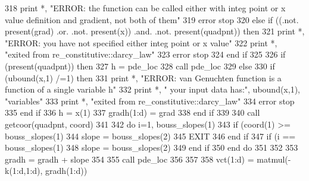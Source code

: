 \begin{DoxyCode}
318           print *, \textcolor{stringliteral}{"ERROR: the function can be called either with integ point or x value definition and
       gradient, not both of them"}
319           error stop
320         \textcolor{keywordflow}{else} \textcolor{keywordflow}{if} ((.not. \textcolor{keyword}{present}(grad) .or. .not. \textcolor{keyword}{present}(x)) .and. .not. \textcolor{keyword}{present}(quadpnt)) \textcolor{keywordflow}{then}
321           print *, \textcolor{stringliteral}{"ERROR: you have not specified either integ point or x value"}
322           print *, \textcolor{stringliteral}{"exited from re\_constitutive::darcy\_law"}
323           error stop
324 \textcolor{keywordflow}{        end if}
325         
326         \textcolor{keywordflow}{if} (\textcolor{keyword}{present}(quadpnt)) \textcolor{keywordflow}{then}
327           h = pde\_loc%
328           \textcolor{keyword}{call }pde\_loc%
329         \textcolor{keywordflow}{else}
330           \textcolor{keywordflow}{if} (ubound(x,1) /=1) \textcolor{keywordflow}{then}
331             print *, \textcolor{stringliteral}{"ERROR: van Genuchten function is a function of a single variable h"}
332             print *, \textcolor{stringliteral}{"       your input data has:"}, ubound(x,1), \textcolor{stringliteral}{"variables"}
333             print *, \textcolor{stringliteral}{"exited from re\_constitutive::darcy\_law"}
334             error stop
335 \textcolor{keywordflow}{          end if}
336           h = x(1)
337           gradh(1:d) = grad
338 \textcolor{keywordflow}{        end if}
339         
340        \textcolor{keyword}{call }getcoor(quadpnt, coord)
341         
342         \textcolor{keywordflow}{do} i=1, bouss_slopes(1)%
343           \textcolor{keywordflow}{if} (coord(1) >= bouss_slopes(1)%
344             slope = bouss_slopes(2)%
345             \textcolor{keywordflow}{EXIT}
346 \textcolor{keywordflow}{          end if}
347           \textcolor{keywordflow}{if} (i == bouss_slopes(1)%
348             slope = bouss_slopes(2)%
349 \textcolor{keywordflow}{          end if}
350 \textcolor{keywordflow}{        end do}
351         
352         
353         gradh = gradh + slope
354         
355         \textcolor{keyword}{call }pde\_loc%
356       
357         
358         vct(1:d) =  matmul(-k(1:d,1:d), gradh(1:d))

\end{DoxyCode}
